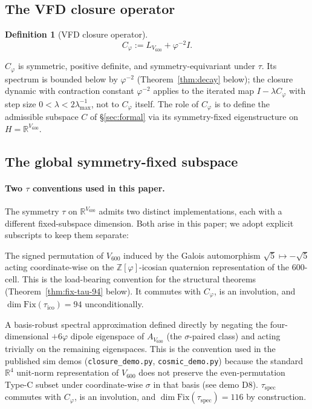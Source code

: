 \documentclass[11pt]{article}
\theoremstyle{plain}
\theoremstyle{definition}
\newtheorem{definition}[theorem]{Definition}
\theoremstyle{remark}
\newcommand{\Zphi}{\mathbb{Z}[\varphi]}
\newcommand{\Fix}{\mathrm{Fix}}
\newcommand{\Cph}{C_\varphi}
\begin{document}
\subsection{The VFD closure operator}

\begin{definition}[VFD closure operator]\label{def:cph-vfd}
\[
  \Cph := L_{V_{600}} + \varphi^{-2} I.
\]
\end{definition}

$\Cph$ is symmetric, positive definite, and symmetry-equivariant under $\tau$. Its spectrum is bounded below by $\varphi^{-2}$ (Theorem~\ref{thm:decay} below); the closure dynamic with contraction constant $\varphi^{-2}$ applies to the iterated map $I - \lambda \Cph$ with step size $0 < \lambda < 2 \lambda_{\max}^{-1}$, not to $\Cph$ itself. The role of $\Cph$ is to define the admissible subspace $C$ of \S\ref{sec:formal} via its symmetry-fixed eigenstructure on $H = \mathbb{R}^{V_{600}}$.

\subsection{The global symmetry-fixed subspace}

\paragraph{Two $\tau$ conventions used in this paper.} The symmetry $\tau$ on $\mathbb{R}^{V_{600}}$ admits two distinct implementations, each with a different fixed-subspace dimension. Both arise in this paper; we adopt explicit subscripts to keep them separate:

\begin{description}[leftmargin=2em]
\item[$\tau_{\mathrm{ico}}$ \textnormal{(icosian $\tau$).}] The signed permutation of $V_{600}$ induced by the Galois automorphism $\sqrt 5 \mapsto -\sqrt 5$ acting coordinate-wise on the $\Zphi$-icosian quaternion representation of the 600-cell. This is the load-bearing convention for the structural theorems (Theorem~\ref{thm:fix-tau-94} below). It commutes with $\Cph$, is an involution, and $\dim \Fix(\tau_{\mathrm{ico}}) = 94$ unconditionally.
\item[$\tau_{\mathrm{spec}}$ \textnormal{(spectral $\tau$).}] A basis-robust spectral approximation defined directly by negating the four-dimensional $+6\varphi$ dipole eigenspace of $A_{V_{600}}$ (the $\sigma$-paired class) and acting trivially on the remaining eigenspaces. This is the convention used in the published sim demos (\texttt{closure\_demo.py}, \texttt{cosmic\_demo.py}) because the standard $\mathbb{R}^4$ unit-norm representation of $V_{600}$ does not preserve the even-permutation Type-C subset under coordinate-wise $\sigma$ in that basis (see demo D8). $\tau_{\mathrm{spec}}$ commutes with $\Cph$, is an involution, and $\dim \Fix(\tau_{\mathrm{spec}}) = 116$ by construction.
\end{description}
\end{document}
